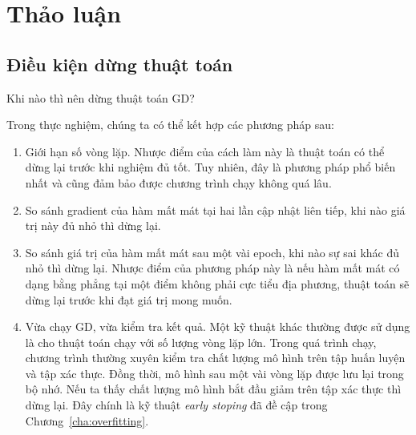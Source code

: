 


\section{Thảo luận}
\subsection{Điều kiện dừng thuật toán}
Khi nào thì nên dừng thuật toán GD?

Trong thực nghiệm, chúng ta có thể kết hợp các phương pháp sau:
\begin{enumerate}
\item  Giới hạn số vòng lặp. Nhược điểm của cách
làm này là thuật toán có thể dừng lại trước khi nghiệm đủ tốt. Tuy nhiên,
đây là phương pháp phổ biến nhất và cũng đảm bảo được chương trình chạy
không quá lâu.

\item  So sánh gradient của hàm mất mát tại hai lần cập nhật liên tiếp, khi nào
giá trị này đủ nhỏ thì dừng lại.

\item  So sánh giá trị của hàm mất mát sau một vài epoch, khi nào sự sai
khác đủ nhỏ thì dừng lại. Nhược điểm của phương pháp này là nếu hàm mất mát có
dạng {bằng phẳng} tại một điểm không phải cực tiểu địa phương, thuật
toán sẽ dừng lại trước khi đạt giá trị mong muốn.

\item Vừa chạy GD, vừa kiểm tra kết quả. Một kỹ thuật khác thường
được sử dụng là cho thuật toán chạy với số lượng vòng lặp lớn. Trong quá
trình chạy, chương trình thường xuyên kiểm tra chất lượng mô hình trên tập
huấn luyện và tập xác thực. Đồng thời, mô hình sau một vài vòng lặp được lưu
lại trong bộ nhớ. Nếu ta thấy chất lượng mô hình bắt đầu giảm trên tập xác thực thì dừng lại. Đây chính là kỹ thuật \textit{early stoping} đã đề cập trong Chương~\ref{cha:overfitting}.


\end{enumerate}




